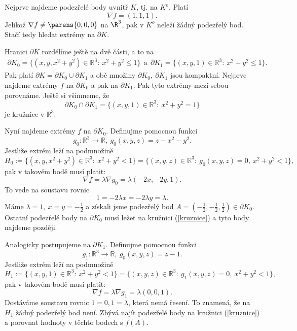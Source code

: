 \documentclass[answers]{exam}
\begin{document}
\begin{questions}
\begin{solution}
\begin{enumerate}[label=(\roman*)]
				Nejprve najdeme podez\v rel\'e body uvnit\v r $K$, tj. na $K^o$. Plat\'i 
				$$\nabla f=(1,1,1).$$
				Jeliko\v z $\nabla f\ne \parens{0,0,0}$ na $\R^3$, pak v $K^o$ nele\v z\'i \v z\'adn\'y podez\v rel\'y bod. Sta\v c\'i tedy hledat extr\'emy na $\partial K$.
				
				Hranici $\partial K$ rozd\v el\'ime je\v st\v e na dv\v e \v c\'asti, a to na
				\begin{align*}
				\partial K_0=\{(x,y,x^2+y^2)\in\mathbb R^3:\ x^2+y^2\le 1 \}\ \ \mathrm{a}\ \  \partial K_1=\{(x,y,1)\in\mathbb R^3:\ x^2+y^2\le 1\}.
				\end{align*}
				Pak plat\'i $\partial K=\partial K_0\cup\partial K_1$ a ob\v e mno\v ziny $\partial K_0,\ \partial K_1$ jsou kompaktn\'i. Nejprve najdeme extr\'emy $f$ na $\partial K_0$ a pak na $\partial K_1$. Pak tyto extr\'emy mezi sebou porovn\'ame. Je\v st\v e si v\v simneme, \v ze 
				\begin{equation}\label{kruznice}
				\partial K_0\cap\partial K_1=\{(x,y,1)\in\mathbb R^3:\ x^2+y^2=1\} 
				\end{equation}
				je kru\v znice v $\mathbb R^3$.
				
				Nyn\'i najdeme extr\'emy $f$ na $\partial K_0$. Definujme pomocnou funkci 
				$$g_0:\mathbb R^3\to\mathbb R,\ g_0(x,y,z)=z-x^2-y^2.$$
				Jestli\v ze extr\'em le\v z\'i na podmno\v zin\v e
				$$H_0:=\{(x,y,x^2+y^2)\in\mathbb R^3:\ x^2+y^2<1\}=\{(x,y,z)\in\mathbb R^3:\ g_0(x,y,z)=0,\ x^2+y^2<1\},$$
				pak v takov\'em bod\v e mus\'i platit:
				$$\nabla f=\lambda\nabla g_0=\lambda (-2x,-2y,1).$$
				To vede na soustavu rovnic
				$$1=-2\lambda x=-2\lambda y=\lambda.$$
				M\'ame $\lambda=1,\ x=y=-\frac{1}{2}$ a z\'iskali jsme podez\v rel\'y bod $A=(-\frac{1}{2},-\frac{1}{2},\frac{1}{2})\in\partial K_0$. Ostatn\'i podez\v rel\'e body na $\partial K_0$ mus\'i le\v zet na kru\v znici (\ref{kruznice}) a tyto body najdeme pozd\v eji.
				
				Analogicky postupujeme na $\partial K_1$. Definujme pomocnou funkci 
				$$g_1:\mathbb R^3\to\mathbb R,\ g_0(x,y,z)=z-1.$$
				Jestli\v ze extr\'em le\v z\'i na podmno\v zin\v e
				$$H_1:=\{(x,y,1)\in\mathbb R^3:\ x^2+y^2<1\}=\{(x,y,z)\in\mathbb R^3:\ g_1(x,y,z)=0,\ x^2+y^2<1\},$$
				pak v takov\'em bod\v e mus\'i platit:
				$$\nabla f=\lambda\nabla g_1=\lambda (0,0,1).$$
				Dost\'av\'ame soustavu rovnic $1=0, 1=\lambda$, kter\'a nem\'a \v resen\'i. To znamen\'a, \v ze na $H_1$ \v z\'adn\'y podez\v rel\'y bod nen\'i. Zbývá naj\'it podez\v rel\'e body na kru\v znici (\ref{kruznice}) a porovnat hodnoty v t\v echto bodech s $f(A)$.
				

\end{enumerate}
\end{solution}
\end{questions}
\end{document}
